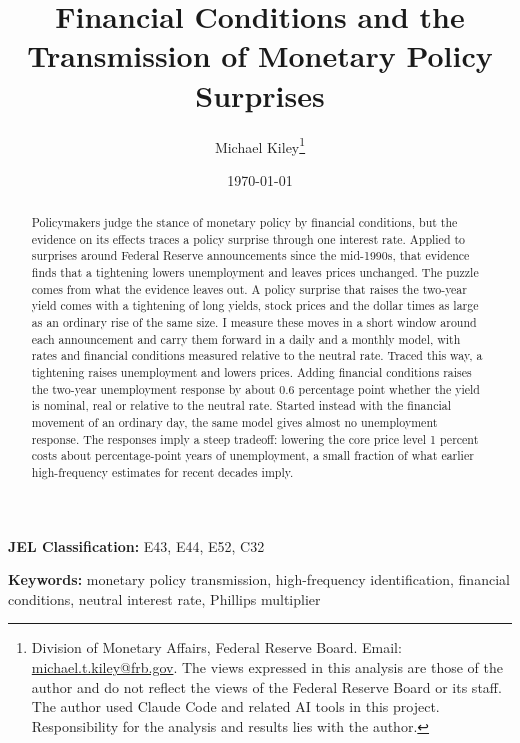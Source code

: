 \documentclass[11pt]{article}
\title{Financial Conditions and the Transmission of Monetary Policy Surprises}
\author{Michael Kiley\thanks{Division of Monetary Affairs, Federal Reserve Board. Email: \href{mailto:michael.t.kiley@frb.gov}{michael.t.kiley@frb.gov}. The views expressed in this analysis are those of the author and do not reflect the views of the Federal Reserve Board or its staff. The author used Claude Code and related AI tools in this project. Responsibility for the analysis and results lies with the author.}}
\date{\today}
\begin{document}
\maketitle

\begin{abstract}
Policymakers judge the stance of monetary policy by financial conditions, but the evidence on its effects traces a policy surprise through one interest rate. Applied to surprises around Federal Reserve announcements since the mid-1990s, that evidence finds that a tightening lowers unemployment and leaves prices unchanged. The puzzle comes from what the evidence leaves out. A policy surprise that raises the two-year yield comes with a tightening of long yields, stock prices and the dollar  times as large as an ordinary rise of the same size. I measure these moves in a short window around each announcement and carry them forward in a daily and a monthly model, with rates and financial conditions measured relative to the neutral rate. Traced this way, a tightening raises unemployment and lowers prices. Adding financial conditions raises the two-year unemployment response by about 0.6 percentage point whether the yield is nominal, real or relative to the neutral rate. Started instead with the financial movement of an ordinary day, the same model gives almost no unemployment response. The responses imply a steep tradeoff: lowering the core price level 1 percent costs about  percentage-point years of unemployment, a small fraction of what earlier high-frequency estimates for recent decades imply.
\end{abstract}

\noindent\textbf{JEL Classification:} E43, E44, E52, C32

\noindent\textbf{Keywords:} monetary policy transmission, high-frequency identification, financial conditions, neutral interest rate, Phillips multiplier

\pagestyle{plain}

\newpage
{}

\end{document}
